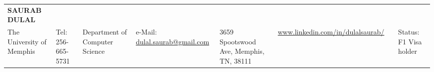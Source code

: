 \documentclass{resume} %
\begin{document}
\begin{multicols}{2}
    \noindent
        \begin{tabular}{ p{8cm} p{9.1cm}}
        
        \textbf{SAURAB DULAL} \\
        The University of Memphis & \raggedleft Tel: 256-665-5731
        & Department of Computer Science & \raggedleft e-Mail: \href{mailto: dulal.saurab@gmail.com}{dulal.saurab@gmail.com}
        & 3659 Spootswood Ave, Memphis, TN, 38111 & \raggedleft  \href{www.linkedin.com/in/dulalsaurab/}{www.linkedin.com/in/dulalsaurab/} & & \raggedleft Status: F1 Visa holder
    
        \end{tabular}
    \end{multicols}
    
\end{document}
